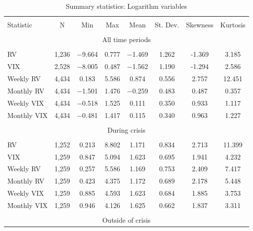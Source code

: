 \begin{table}[!htbp] \centering 
  \caption{Summary statistics: Logarithm variables} 
  \label{tab:summary2} 
\begin{tabular}{@{\extracolsep{5pt}}lccccccc} 
\\[-1.8ex]\hline 
\hline \\[-1.8ex] 
Statistic & \multicolumn{1}{c}{N} & \multicolumn{1}{c}{Min} & \multicolumn{1}{c}{Max} & \multicolumn{1}{c}{Mean} & \multicolumn{1}{c}{St. Dev.} & \multicolumn{1}{c}{Skewness} & \multicolumn{1}{c}{Kurtosis} \\ 
\hline \\[-1.8ex] 
\multicolumn{8}{c}{All time periods} \\
\hline \\[-1.8ex] 
RV & 1,236 & $-$9.664 & 0.777 & $-$1.469 & 1.262 & -1.369 & 3.185 \\ 
VIX & 2,528 & $-$8.005 & 0.487 & $-$1.562 & 1.190 & -1.294 & 2.586\\ 
Weekly RV & 4,434 & 0.183 & 5.586 & 0.874 & 0.556  &  2.757 & 12.451\\ 
Monthly RV & 4,434 & $-$1.501 & 1.476 & $-$0.259 & 0.483 &  0.487 & 0.357  \\ 
Weekly VIX & 4,434 & $-$0.518 & 1.525 & 0.111 & 0.350 & 0.933 &  1.117  \\ 
Monthly VIX & 4,434 & $-$0.481 & 1.417 & 0.115 & 0.340 &  0.963 &   1.227\\ 
\hline \\[-1.8ex] 
\multicolumn{8}{c}{During crisis} \\
\hline \\[-1.8ex] 
RV & 1,252 & 0.213 & 8.802 & 1.171 & 0.834 & 2.713 & 11.399\\ 
VIX & 1,259 & 0.847 & 5.094 & 1.623 & 0.695 & 1.941 & 4.232 \\ 
Weekly RV & 1,259 & 0.257 & 5.586 & 1.169 & 0.753 &  2.409 & 7.417 \\ 
Monthly RV & 1,259 & 0.423 & 4.375 & 1.172 & 0.689 & 2.178 & 5.448\\ 
Weekly VIX & 1,259 & 0.885 & 4.593 & 1.623 & 0.684 &  1.885 &  3.753\\ 
Monthly VIX & 1,259 & 0.946 & 4.126 & 1.625 & 0.662 &  1.837 &  3.311\\ 
\hline \\[-1.8ex] 
\multicolumn{8}{c}{Outside of crisis} \\                           

\end{tabular}
\end{table}
